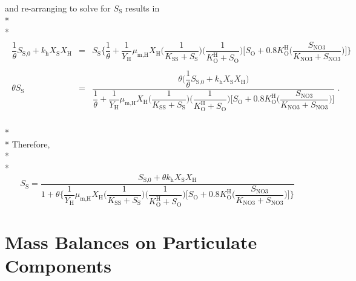 \documentclass[]{article}
\begin{document}
and re-arranging to solve for $S_{\text{S}}$ results in  \\* \\*
\begin{align}
\nonumber
\begin{array}{rcl}
\dfrac{1}{\theta}S_{\text{S,0}} + k_{\text{h}}X_{\text{S}}X_{\text{H}} &=& S_{\text{S}} \Bigg\{\dfrac{1}{\theta} + \dfrac{1}{Y_{\text{H}}}\mu_{\text{m,H}}X_{\text{H}}\Bigg(\dfrac{1}{K_{\text{SS}}+S_{\text{S}}}\Bigg)\Bigg(\dfrac{1}{K^{\text{H}}_{\text{O}}+S_{\text{O}}}\Bigg)\Bigg[S_{\text{O}} + 0.8K^{\text{H}}_{\text{O}}\Bigg(\dfrac{S_{\text{NO3}}}{K_{\text{NO3}}+S_{\text{NO3}}}\Bigg)\Bigg] \Bigg\} \\ \\
\theta S_{\text{S}} &=& \dfrac{\theta \Bigg(\dfrac{1}{\theta}S_{\text{S,0}} + k_{\text{h}}X_{\text{S}}X_{\text{H}}\Bigg)}{\dfrac{1}{\theta} + \dfrac{1}{Y_{\text{H}}}\mu_{\text{m,H}}X_{\text{H}}\Bigg(\dfrac{1}{K_{\text{SS}}+S_{\text{S}}}\Bigg)\Bigg(\dfrac{1}{K^{\text{H}}_{\text{O}}+S_{\text{O}}}\Bigg)\Bigg[S_{\text{O}} + 0.8K^{\text{H}}_{\text{O}}\Bigg(\dfrac{S_{\text{NO3}}}{K_{\text{NO3}}+S_{\text{NO3}}}\Bigg)\Bigg]} \; .
\end{array}
\end{align} \\* \\* 
Therefore, \\* \\*
\begin{equation}
\nonumber
\boxed{S_{\text{S}} = \dfrac{S_{\text{S,0}} + \theta k_{\text{h}}X_{\text{S}}X_{\text{H}}}{1 + \theta \Bigg\{\dfrac{1}{Y_{\text{H}}}\mu_{\text{m,H}}X_{\text{H}}\Bigg(\dfrac{1}{K_{\text{SS}}+S_{\text{S}}}\Bigg)\Bigg(\dfrac{1}{K^{\text{H}}_{\text{O}}+S_{\text{O}}}\Bigg)\Bigg[S_{\text{O}} + 0.8K^{\text{H}}_{\text{O}}\Bigg(\dfrac{S_{\text{NO3}}}{K_{\text{NO3}}+S_{\text{NO3}}}\Bigg)\Bigg]\Bigg\}}}
\end{equation}
\newpage
\section{Mass Balances on Particulate Components}
\end{document}
